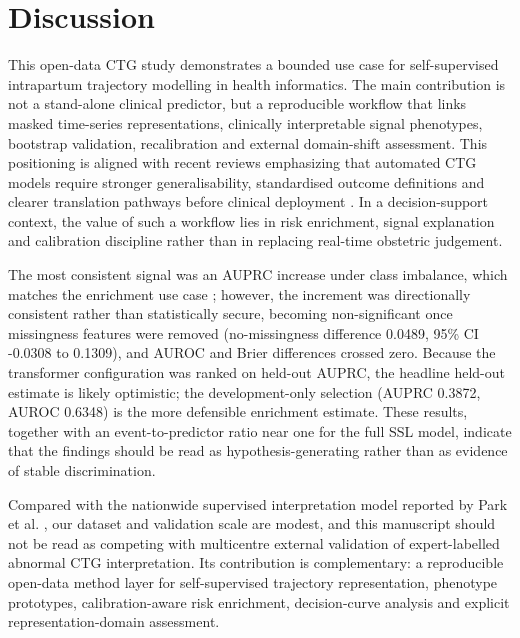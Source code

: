 \documentclass[pdflatex,sn-nature]{sn-jnl}
\begin{document}
\section{Discussion}

This open-data CTG study demonstrates a bounded use case for self-supervised intrapartum trajectory modelling in health informatics. The main contribution is not a stand-alone clinical predictor, but a reproducible workflow that links masked time-series representations, clinically interpretable signal phenotypes, bootstrap validation, recalibration and external domain-shift assessment. This positioning is aligned with recent reviews emphasizing that automated CTG models require stronger generalisability, standardised outcome definitions and clearer translation pathways before clinical deployment \cite{mendis2023,francis2024}. In a decision-support context, the value of such a workflow lies in risk enrichment, signal explanation and calibration discipline rather than in replacing real-time obstetric judgement.

The most consistent signal was an AUPRC increase under class imbalance, which matches the enrichment use case \cite{davis2006}; however, the increment was directionally consistent rather than statistically secure, becoming non-significant once missingness features were removed (no-missingness difference 0.0489, 95\% CI -0.0308 to 0.1309), and AUROC and Brier differences crossed zero. Because the transformer configuration was ranked on held-out AUPRC, the headline held-out estimate is likely optimistic; the development-only selection (AUPRC 0.3872, AUROC 0.6348) is the more defensible enrichment estimate. These results, together with an event-to-predictor ratio near one for the full SSL model, indicate that the findings should be read as hypothesis-generating rather than as evidence of stable discrimination.

Compared with the nationwide supervised interpretation model reported by Park et al. \cite{park2025nationwide}, our dataset and validation scale are modest, and this manuscript should not be read as competing with multicentre external validation of expert-labelled abnormal CTG interpretation. Its contribution is complementary: a reproducible open-data method layer for self-supervised trajectory representation, phenotype prototypes, calibration-aware risk enrichment, decision-curve analysis and explicit representation-domain assessment.
\end{document}
